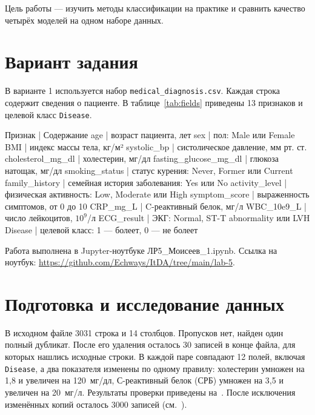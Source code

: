 \documentclass[a4paper,14pt]{extarticle}
\begin{document}
\maketitle
\suaitoc

\suaiintro

Цель работы — изучить методы классификации на практике и сравнить качество четырёх моделей на одном наборе данных.

\section{Вариант задания}

В варианте 1 используется набор \texttt{medical\_diagnosis.csv}. Каждая строка содержит сведения о пациенте. В таблице~\ref{tab:fields} приведены 13 признаков и целевой класс \texttt{Disease}.

Признак | Содержание
age | возраст пациента, лет
sex | пол: Male или Female
BMI | индекс массы тела, кг/м²
systolic\_bp | систолическое давление, мм рт. ст.
cholesterol\_mg\_dl | холестерин, мг/дл
fasting\_glucose\_mg\_dl | глюкоза натощак, мг/дл
smoking\_status | статус курения: Never, Former или Current
family\_history | семейная история заболевания: Yes или No
activity\_level | физическая активность: Low, Moderate или High
symptom\_score | выраженность симптомов, от 0 до 10
CRP\_mg\_L | C-реактивный белок, мг/л
WBC\_10e9\_L | число лейкоцитов, $10^9$/л
ECG\_result | ЭКГ: Normal, ST-T abnormality или LVH
Disease | целевой класс: 1 — болеет, 0 — не болеет

Работа выполнена в Jupyter-ноутбуке ЛР5\_Моисеев\_1.ipynb. Ссылка на ноутбук: \url{https://github.com/Echways/ItDA/tree/main/lab-5}.

\section{Подготовка и исследование данных}

В исходном файле 3031 строка и 14 столбцов. Пропусков нет, найден один полный дубликат. После его удаления осталось 30 записей в конце файла, для которых нашлись исходные строки. В каждой паре совпадают 12 полей, включая \texttt{Disease}, а два показателя изменены по одному правилу: холестерин умножен на 1,8 и увеличен на 120~мг/дл, С-реактивный белок (СРБ) умножен на 3,5 и увеличен на 20~мг/л. Результаты проверки приведены на~. После исключения изменённых копий осталось 3000 записей (см.~).
\end{document}
